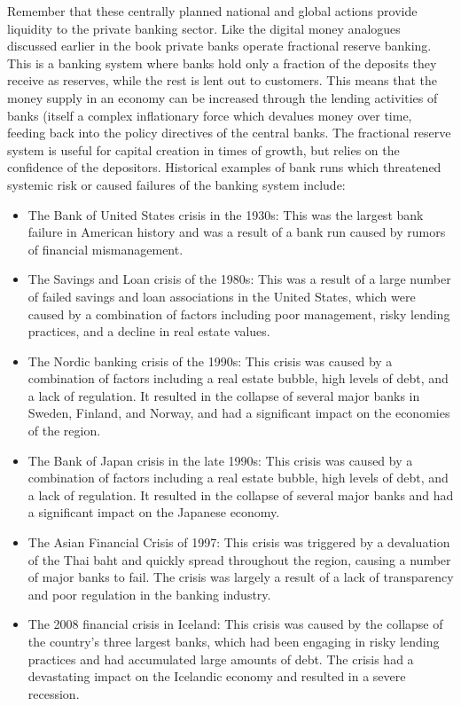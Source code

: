 Remember that these centrally planned national and global actions provide liquidity to the private banking sector. Like the digital money analogues discussed earlier in the book private banks operate fractional reserve banking. This is a banking system where banks hold only a fraction of the deposits they receive as reserves, while the rest is lent out to customers. This means that the money supply in an economy can be increased through the lending activities of banks (itself a complex inflationary force which devalues money over time, feeding back into the policy directives of the central banks. The fractional reserve system is useful for capital creation in times of growth, but relies on the confidence of the depositors. Historical examples of bank runs which threatened systemic risk or caused failures of the banking system include:
\begin{itemize}
\item The Bank of United States crisis in the 1930s: This was the largest bank failure in American history and was a result of a bank run caused by rumors of financial mismanagement.
\item The Savings and Loan crisis of the 1980s: This was a result of a large number of failed savings and loan associations in the United States, which were caused by a combination of factors including poor management, risky lending practices, and a decline in real estate values.
\item The Nordic banking crisis of the 1990s: This crisis was caused by a combination of factors including a real estate bubble, high levels of debt, and a lack of regulation. It resulted in the collapse of several major banks in Sweden, Finland, and Norway, and had a significant impact on the economies of the region.
\item The Bank of Japan crisis in the late 1990s: This crisis was caused by a combination of factors including a real estate bubble, high levels of debt, and a lack of regulation. It resulted in the collapse of several major banks and had a significant impact on the Japanese economy.
\item The Asian Financial Crisis of 1997: This crisis was triggered by a devaluation of the Thai baht and quickly spread throughout the region, causing a number of major banks to fail. The crisis was largely a result of a lack of transparency and poor regulation in the banking industry.
\item The 2008 financial crisis in Iceland: This crisis was caused by the collapse of the country's three largest banks, which had been engaging in risky lending practices and had accumulated large amounts of debt. The crisis had a devastating impact on the Icelandic economy and resulted in a severe recession.

\end{itemize}
